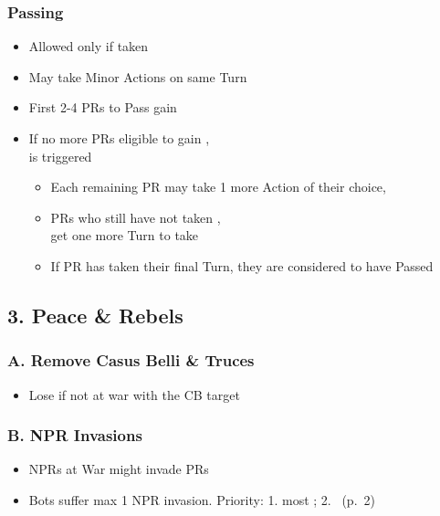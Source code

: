 \documentclass[10pt]{article}
\begin{document}
\subsubsection*{Passing}
\begin{itemize}
	\item Allowed only if  taken
	\item May take Minor Actions on same Turn
	\item First 2-4 PRs to Pass gain \ducats
	\item If no more PRs eligible to gain \ducats,\\  is triggered
	\begin{itemize}
		\item Each remaining PR may take 1 more Action of their choice, 
		\item PRs who still have not taken ,\\ get one more Turn to take 
		\item If PR has taken their final Turn, they are considered to have Passed
	\end{itemize}
\end{itemize}

\subsection*{3. Peace \& Rebels}
\subsubsection*{A. Remove Casus Belli \& Truces}
\begin{itemize}
	\item Lose  if not at war with the CB target
\end{itemize}

\subsubsection*{B. NPR Invasions }
\begin{itemize}
	\item {}NPRs at War might invade PRs
	\botrules
	\item Bots suffer max 1 NPR invasion. Priority: 1. most \rebels; 2. \az (p.~2)
\end{itemize}
\end{document}
